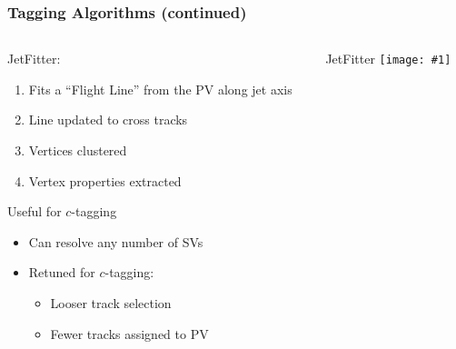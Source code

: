\documentclass[usenames,dvipsnames]{beamer}
\newcommand{\widegraphic}[1]{\texttt{[image: \#1]}}
\begin{document}
\begin{frame}
  \frametitle{Tagging Algorithms (continued)}
  \begin{columns}
    \begin{column}{0.5\textwidth}
      JetFitter:
      \begin{enumerate}
      \item Fits a ``Flight Line'' from the PV along jet axis
      \item Line updated to cross tracks
      \item Vertices clustered
      \item Vertex properties extracted
      \end{enumerate}
      Useful for $c$-tagging
      \begin{itemize}
      \item Can resolve any number of SVs
      \item Retuned for $c$-tagging:
        \begin{itemize}
        \item Looser track selection
        \item Fewer tracks assigned to PV
        \end{itemize}
      \end{itemize}
    \end{column}
    \begin{column}{0.5\textwidth}
        \begin{center}
          JetFitter
      \widegraphic{figures/external/b-jet-jf.pdf}
        \end{center}
    \end{column}
  \end{columns}
\end{frame}
\end{document}
